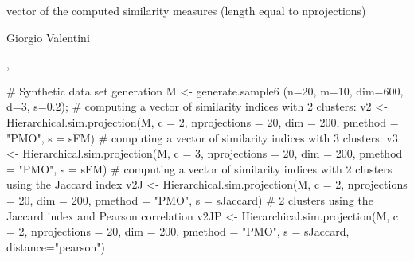 \documentclass{article}
\begin{document}
\begin{Value}
vector of the computed similarity measures (length equal to nprojections)
\end{Value}
\begin{Author}\relax
Giorgio Valentini 
\end{Author}
\begin{SeeAlso}\relax
{}, 
\end{SeeAlso}
\begin{Examples}
\begin{ExampleCode}
# Synthetic data set generation
M <- generate.sample6 (n=20, m=10, dim=600, d=3, s=0.2);
# computing a vector of similarity indices with 2 clusters:
v2 <- Hierarchical.sim.projection(M, c = 2, nprojections = 20, dim = 200, 
                                  pmethod = "PMO", s = sFM)
# computing a vector of similarity indices with 3 clusters:
v3 <- Hierarchical.sim.projection(M, c = 3, nprojections = 20, dim = 200, 
                                  pmethod = "PMO", s = sFM)
# computing a vector of similarity indices with 2 clusters using the Jaccard index
v2J <- Hierarchical.sim.projection(M, c = 2, nprojections = 20, dim = 200, 
                                   pmethod = "PMO", s = sJaccard)
#  2 clusters using the Jaccard index and Pearson correlation
v2JP <- Hierarchical.sim.projection(M, c = 2, nprojections = 20, dim = 200, 
                                    pmethod = "PMO", s = sJaccard, distance="pearson")
\end{ExampleCode}
\end{Examples}
\end{document}
